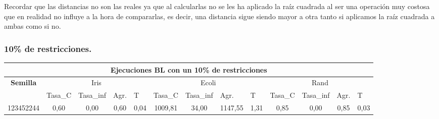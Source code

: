 \documentclass[12pt, spanish]{article}
\begin{document}
Recordar que las distancias no son las reales ya que al calcularlas no se les ha aplicado la raíz cuadrada al ser una operación muy costosa que en realidad no influye a la hora de compararlas, es decir, una distancia sigue siendo mayor a otra tanto si aplicamos la raíz cuadrada a ambas como si no.

\subsubsection{10\% de restricciones.}

\begin{table}[H]
\small

\begin{adjustwidth}{-1cm}{-1cm}%

\begin{tabular}{|l|c|c|c|c|c|c|c|c|c|c|c|c|}
\hline
\multicolumn{13}{|c|}{\textbf{Ejecuciones BL con un 10\% de restricciones}}                                                                                                                                                                                                                                                                                                                                            \\ \hline
\multicolumn{1}{|c|}{\multirow{2}{*}{\textbf{Semilla}}} & \multicolumn{4}{c|}{Iris}                                                                                          & \multicolumn{4}{c|}{Ecoli}                                                                                         & \multicolumn{4}{c|}{Rand}                                                                                          \\ \cline{2-13} 
\multicolumn{1}{|c|}{}                                  & \multicolumn{1}{l|}{Tasa\_C} & \multicolumn{1}{l|}{Tasa\_inf} & \multicolumn{1}{l|}{Agr.} & \multicolumn{1}{l|}{T} & \multicolumn{1}{l|}{Tasa\_C} & \multicolumn{1}{l|}{Tasa\_inf} & \multicolumn{1}{l|}{Agr.} & \multicolumn{1}{l|}{T} & \multicolumn{1}{l|}{Tasa\_C} & \multicolumn{1}{l|}{Tasa\_inf} & \multicolumn{1}{l|}{Agr.} & \multicolumn{1}{l|}{T} \\ \hline
123452244                                               & 0,60                         & 0,00                           & 0,60                      & 0,04                   & 1009,81                      & 34,00                          & 1147,55                   & 1,31                   & 0,85                         & 0,00                           & 0,85                      & 0,03                   \\ \hline

\end{tabular}
\end{adjustwidth}
\end{table}
\end{document}
